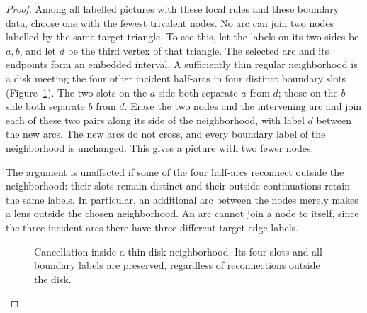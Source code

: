 \begin{proof}
Among all labelled pictures with these local rules and these boundary
data, choose one with the fewest trivalent nodes. No arc can join two
nodes labelled by the same target triangle. To see this, let the labels
on its two sides be $a,b$, and let $d$ be the third vertex of that
triangle. The selected arc and its endpoints form an embedded interval.
A sufficiently thin regular neighborhood is a disk meeting the four
other incident half-arcs in four distinct boundary slots
(Figure~\ref{fig:picture-cancellation}). The two slots
on the $a$-side both separate $a$ from $d$; those on the $b$-side both
separate $b$ from $d$. Erase the two nodes and the intervening arc and
join each of these two pairs along its side of the neighborhood, with
label $d$ between the new arcs. The new arcs do not cross, and every
boundary label of the neighborhood is unchanged. This gives a picture
with two fewer nodes.

The argument is unaffected if some of the four half-arcs reconnect
outside the neighborhood: their slots remain distinct and their outside
continuations retain the same labels. In particular, an additional arc
between the nodes merely makes a lens outside the chosen neighborhood.
An arc cannot join a node to itself, since the three incident arcs there
have three different target-edge labels.

\begin{figure}[htbp]
\centering
{}
\caption{Cancellation inside a thin disk neighborhood. Its four slots
and all boundary labels are preserved, regardless of reconnections
outside the disk.}
\label{fig:picture-cancellation}
\end{figure}


\end{proof}
